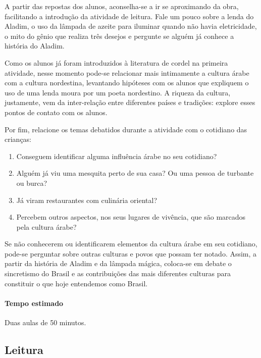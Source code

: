 \documentclass[11pt]{extarticle}
\begin{document}
A partir das repostas dos alunos, aconselha-se a ir se aproximando da obra, facilitando a introdução da atividade de leitura. Fale um pouco sobre a lenda do Aladim, o uso da lâmpada de azeite para iluminar quando não havia eletricidade, o mito do gênio que realiza três desejos e pergunte se alguém já conhece a história do Aladim.

Como os alunos já foram introduzidos à literatura de cordel na primeira atividade, nesse momento pode-se relacionar mais intimamente a cultura árabe com a cultura nordestina, levantando hipóteses com os alunos que expliquem o uso de uma lenda moura por um poeta nordestino. A riqueza da cultura, justamente, vem da inter-relação entre diferentes países e tradições: explore esses pontos de contato com os alunos.

Por fim, relacione os temas debatidos durante a atividade com o cotidiano das crianças: 

\begin{enumerate}
\item Conseguem identificar alguma influência árabe no seu cotidiano?

\item Alguém já viu uma mesquita perto de sua casa? Ou uma pessoa de turbante ou burca?

\item Já viram restaurantes com culinária oriental?

\item Percebem outros aspectos, nos seus lugares de vivência, que são marcados pela cultura árabe?
\end{enumerate}

Se não conhecerem ou identificarem elementos da cultura árabe em seu cotidiano, pode-se perguntar sobre outras culturas e povos que possam ter notado. Assim, a partir da história de Aladim e da lâmpada mágica, coloca-se em debate o sincretismo do Brasil e as contribuições das mais diferentes culturas para constituir o que hoje entendemos como Brasil.


\paragraph{Tempo estimado} Duas aulas de 50 minutos.

\subsection{Leitura}

\end{document}

